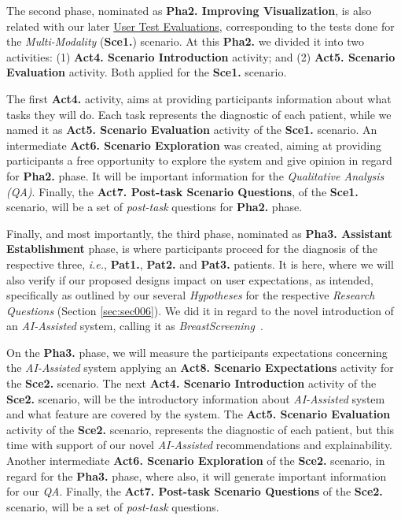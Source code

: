 The second phase, nominated as \textbf{Pha2. Improving Visualization}, is also related with our later \href{https://github.com/MIMBCD-UI/prototype-breast-screening/wiki/User-Research#user-test-evaluations-}{User Test Evaluations}, corresponding to the tests done for the \textit{Multi-Modality} (\textbf{Sce1.}) scenario. At this \textbf{Pha2.} we divided it into two activities: (1) \textbf{Act4. Scenario Introduction} activity; and (2) \textbf{Act5. Scenario Evaluation} activity. Both applied for the {\bf Sce1.} scenario.

The first \textbf{Act4.} activity, aims at providing participants information about what tasks they will do. Each task represents the diagnostic of each patient, while we named it as \textbf{Act5. Scenario Evaluation} activity of the {\bf Sce1.} scenario. An intermediate \textbf{Act6. Scenario Exploration} was created, aiming at providing participants a free opportunity to explore the system and give opinion in regard for {\bf Pha2.} phase. It will be important information for the {\it Qualitative Analysis (QA)}. Finally, the \textbf{Act7. Post-task Scenario Questions}, of the {\bf Sce1.} scenario, will be a set of \textit{post-task} questions for {\bf Pha2.} phase.

Finally, and most importantly, the third phase, nominated as \textbf{Pha3. Assistant Establishment} phase, is where participants proceed for the diagnosis of the respective three, \textit{i.e.}, \textbf{Pat1.}, \textbf{Pat2.} and \textbf{Pat3.} patients. It is here, where we will also verify if our proposed designs impact \cite{amershi2019guidelines, kocielnik2019will} on user expectations, as intended, specifically as outlined by our several \textit{Hypotheses} for the respective \textit{Research Questions} (Section \ref{sec:sec006}). We did it in regard to the novel introduction of an \textit{AI-Assisted} system, calling it as \textit{BreastScreening}~\cite{calistobreastscreening}.

On the {\bf Pha3.} phase, we will measure the participants expectations concerning the \textit{AI-Assisted} system applying an \textbf{Act8. Scenario Expectations} activity for the {\bf Sce2.} scenario. The next \textbf{Act4.  Scenario Introduction} activity of the {\bf Sce2.} scenario, will be the introductory information about \textit{AI-Assisted} system and what feature are covered by the system. The \textbf{Act5. Scenario Evaluation} activity of the {\bf Sce2.} scenario, represents the diagnostic of each patient, but this time with support of our novel \textit{AI-Assisted} recommendations and explainability. Another intermediate \textbf{Act6. Scenario Exploration} of the {\bf Sce2.} scenario, in regard for the {\bf Pha3.} phase, where also, it will generate important information for our {\it QA}. Finally, the \textbf{Act7. Post-task Scenario Questions} of the {\bf Sce2.} scenario, will be a set of \textit{post-task} questions.

